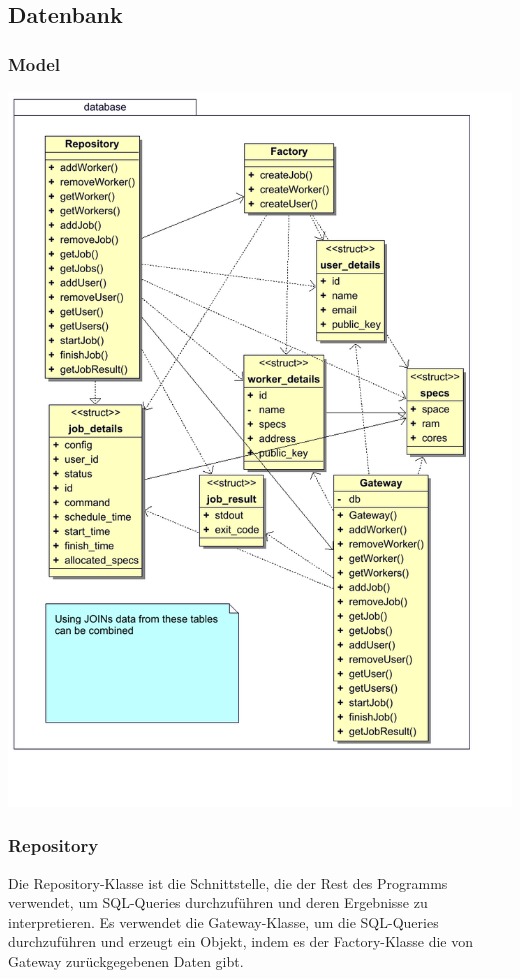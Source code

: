 \documentclass[a4paper,12pt]{article}
\begin{document}
\fi

\subsection{Datenbank}
\subsubsection{Model}

\includegraphics[width=\textwidth]{database}

\subsubsection{Repository}

Die Repository-Klasse ist die Schnittstelle, die der Rest des Programms verwendet, um SQL-Queries durchzuführen und deren Ergebnisse zu interpretieren. Es verwendet die Gateway-Klasse, um die SQL-Queries durchzuführen und erzeugt ein Objekt, indem es der Factory-Klasse die von Gateway zurückgegebenen Daten gibt.
\end{document}
